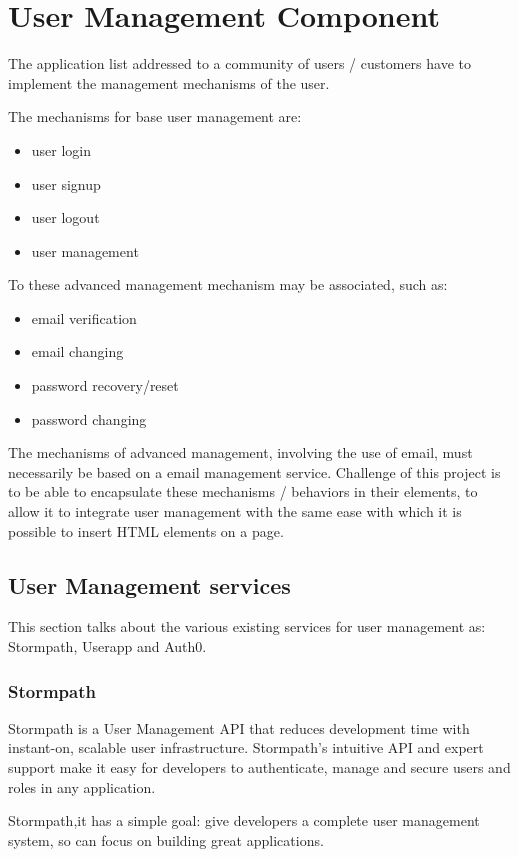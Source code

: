 \section{User Management Component}
\label{sec:USR_user_management}

The application list addressed to a community of users / customers have to implement the management mechanisms of the user.

The mechanisms for base user management are:
\begin{itemize}
\item user login 
\item user signup
\item user logout
\item user management
\end{itemize}
To these advanced management mechanism may be associated, such as:
\begin{itemize}
\item email verification 
\item email changing  
\item password recovery/reset 
\item password changing  
\end{itemize}

The mechanisms of advanced management, involving the use of email, must necessarily be based on a email management service.
Challenge of this project is to be able to encapsulate these mechanisms / behaviors in their elements, to allow it to integrate user management with the same ease with which it is possible to insert HTML elements on a page.

\subsection{User Management services}
\label{subsec:USR_user_management_services}
This section talks about the various existing services for user management as: Stormpath, Userapp and Auth0.
\subsubsection{Stormpath}

Stormpath is a User Management API that reduces development time with instant-on, scalable user infrastructure. Stormpath's intuitive API and expert support make it easy for developers to authenticate, manage and secure users and roles in any application.

Stormpath,it has a simple goal: give developers a complete user management system, so can focus on building great applications.\cite{usr_stormpath}

